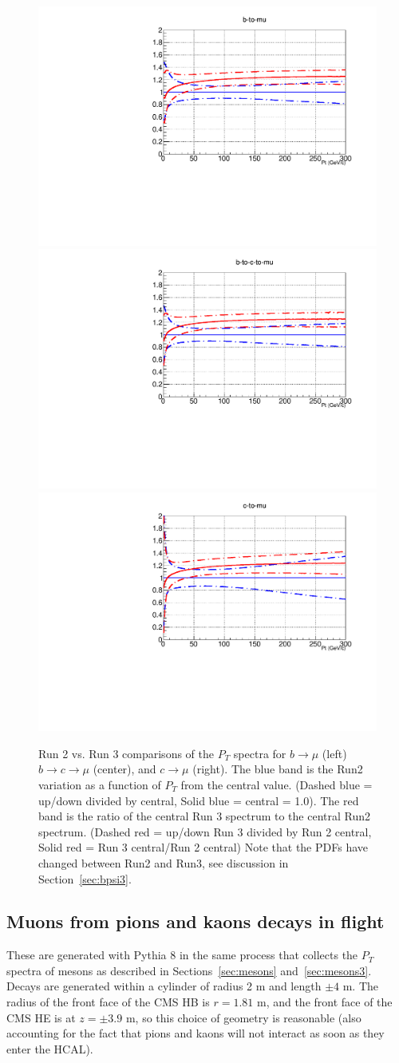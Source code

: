 \documentclass[12pt]{article}
\begin{document}
\begin{figure}[H]
\includegraphics[width=0.31\linewidth]{../muons/data/b-to-mu_Run2_Run3_comparison.pdf}
\includegraphics[width=0.31\linewidth]{../muons/data/b-to-c-to-mu_Run2_Run3_comparison.pdf}
\includegraphics[width=0.31\linewidth]{../muons/data/c-to-mu_Run2_Run3_comparison.pdf}
\caption{Run 2 vs. Run 3 comparisons of the $P_T$ spectra for $b \to \mu$ (left)
    $b \to c \to \mu$ (center), and $c \to \mu$ (right).
      The blue band is the Run2 variation as a function of $P_T$ from the central value.
(Dashed blue = up/down divided by central, Solid blue = central = 1.0).
The red band is the ratio of the central Run 3 spectrum to the central Run2 spectrum.
(Dashed red = up/down Run 3 divided by Run 2 central, Solid red = Run 3 central/Run 2 central)
Note that the PDFs have changed between Run2 and Run3, see discussion
in Section~\ref{sec:bpsi3}.}
  \label{fig:bmuon23}
\end{figure}

\subsection{Muons from pions and kaons decays in flight}
\label{sec:decays-in-flight}
These are generated with Pythia 8 in the same process that collects the
$P_T$ spectra of mesons as described in Sections~\ref{sec:mesons} and~\ref{sec:mesons3}.
Decays are generated within a cylinder of radius 2 m and length $\pm 4$ m.
The radius of the front face of the CMS HB is $r=1.81$ m, and the front
face of the CMS HE is at $z = \pm 3.9$ m, so this choice of geometry
is reasonable (also accounting for the fact that pions and kaons will not
interact as soon as they enter the HCAL).
\end{document}
